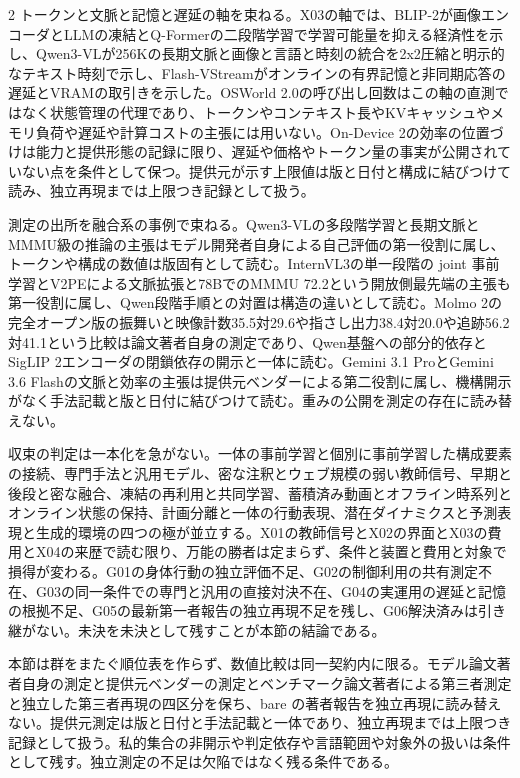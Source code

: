 \documentclass[lualatex,a4paper,10pt]{jlreq}
\begin{document}
\begin{multicols}{2}
\noindent トークンと文脈と記憶と遅延の軸を束ねる。X03の軸では、BLIP-2が画像エンコーダとLLMの凍結とQ-Formerの二段階学習で学習可能量を抑える経済性を示し、Qwen3-VLが256Kの長期文脈と画像と言語と時刻の統合を2x2圧縮と明示的なテキスト時刻で示し、Flash-VStreamがオンラインの有界記憶と非同期応答の遅延とVRAMの取引きを示した。OSWorld 2.0の呼び出し回数はこの軸の直測ではなく状態管理の代理であり、トークンやコンテキスト長やKVキャッシュやメモリ負荷や遅延や計算コストの主張には用いない。On-Device 2の効率の位置づけは能力と提供形態の記録に限り、遅延や価格やトークン量の事実が公開されていない点を条件として保つ。提供元が示す上限値は版と日付と構成に結びつけて読み、独立再現までは上限つき記録として扱う。\autocite{vmd059,vmd065,vmd089,vmd091,vmd100}\par\medskip
\noindent 測定の出所を融合系の事例で束ねる。Qwen3-VLの多段階学習と長期文脈とMMMU級の推論の主張はモデル開発者自身による自己評価の第一役割に属し、トークンや構成の数値は版固有として読む。InternVL3の単一段階の joint 事前学習とV2PEによる文脈拡張と78BでのMMMU 72.2という開放側最先端の主張も第一役割に属し、Qwen段階手順との対置は構造の違いとして読む。Molmo 2の完全オープン版の振舞いと映像計数35.5対29.6や指さし出力38.4対20.0や追跡56.2対41.1という比較は論文著者自身の測定であり、Qwen基盤への部分的依存とSigLIP 2エンコーダの閉鎖依存の開示と一体に読む。Gemini 3.1 ProとGemini 3.6 Flashの文脈と効率の主張は提供元ベンダーによる第二役割に属し、機構開示がなく手法記載と版と日付に結びつけて読む。重みの公開を測定の存在に読み替えない。\autocite{vmd065,vmd070,vmd071,vmd072,vmd073}\par\medskip
\noindent 収束の判定は一本化を急がない。一体の事前学習と個別に事前学習した構成要素の接続、専門手法と汎用モデル、密な注釈とウェブ規模の弱い教師信号、早期と後段と密な融合、凍結の再利用と共同学習、蓄積済み動画とオフライン時系列とオンライン状態の保持、計画分離と一体の行動表現、潜在ダイナミクスと予測表現と生成的環境の四つの極が並立する。X01の教師信号とX02の界面とX03の費用とX04の来歴で読む限り、万能の勝者は定まらず、条件と装置と費用と対象で損得が変わる。G01の身体行動の独立評価不足、G02の制御利用の共有測定不在、G03の同一条件での専門と汎用の直接対決不在、G04の実運用の遅延と記憶の根拠不足、G05の最新第一者報告の独立再現不足を残し、G06解決済みは引き継がない。未決を未決として残すことが本節の結論である。\autocite{vmd003,vmd035,vmd051,vmd062,vmd096,vmd010,vmd047,vmd059,vmd065,vmd089,vmd091,vmd100,vmd056,vmd080,vmd098,vmd110}\par\medskip
\end{multicols}
\begin{claimboundary}[本節の読解上の境界]
\noindent 本節は群をまたぐ順位表を作らず、数値比較は同一契約内に限る。モデル論文著者自身の測定と提供元ベンダーの測定とベンチマーク論文著者による第三者測定と独立した第三者再現の四区分を保ち、bare の著者報告を独立再現に読み替えない。提供元測定は版と日付と手法記載と一体であり、独立再現までは上限つき記録として扱う。私的集合の非開示や判定依存や言語範囲や対象外の扱いは条件として残す。独立測定の不足は欠陥ではなく残る条件である。\autocite{vmd110,vmd108,vmd109,vmd078,vmd079,vmd081,vmd086,vmd087,vmd072,vmd073,vmd099,vmd100,vmd106,vmd107}\par
\end{claimboundary}
\end{document}
